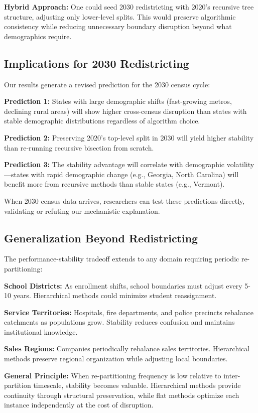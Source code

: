 \textbf{Hybrid Approach:} One could seed 2030 redistricting with 2020's recursive tree structure, adjusting only lower-level splits. This would preserve algorithmic consistency while reducing unnecessary boundary disruption beyond what demographics require.

\subsection{Implications for 2030 Redistricting}

Our results generate a revised prediction for the 2030 census cycle:

\textbf{Prediction 1:} States with large demographic shifts (fast-growing metros, declining rural areas) will show higher cross-census disruption than states with stable demographic distributions regardless of algorithm choice.

\textbf{Prediction 2:} Preserving 2020's top-level split in 2030 will yield higher stability than re-running recursive bisection from scratch.

\textbf{Prediction 3:} The stability advantage will correlate with demographic volatility—states with rapid demographic change (e.g., Georgia, North Carolina) will benefit more from recursive methods than stable states (e.g., Vermont).

When 2030 census data arrives, researchers can test these predictions directly, validating or refuting our mechanistic explanation.

\subsection{Generalization Beyond Redistricting}

The performance-stability tradeoff extends to any domain requiring periodic re-partitioning:

\textbf{School Districts:} As enrollment shifts, school boundaries must adjust every 5-10 years. Hierarchical methods could minimize student reassignment.

\textbf{Service Territories:} Hospitals, fire departments, and police precincts rebalance catchments as populations grow. Stability reduces confusion and maintains institutional knowledge.

\textbf{Sales Regions:} Companies periodically rebalance sales territories. Hierarchical methods preserve regional organization while adjusting local boundaries.

\textbf{General Principle:} When re-partitioning frequency is low relative to inter-partition timescale, stability becomes valuable. Hierarchical methods provide continuity through structural preservation, while flat methods optimize each instance independently at the cost of disruption.

